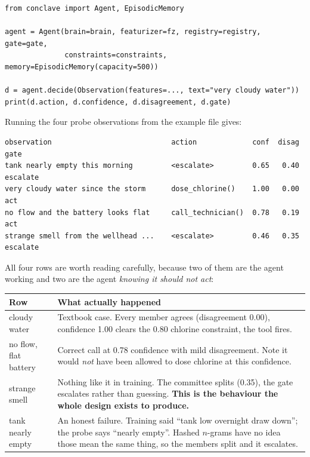 \begin{codebox}
\begin{lstlisting}[style=py]
from conclave import Agent, EpisodicMemory

agent = Agent(brain=brain, featurizer=fz, registry=registry, gate=gate,
              constraints=constraints, memory=EpisodicMemory(capacity=500))

d = agent.decide(Observation(features=..., text="very cloudy water"))
print(d.action, d.confidence, d.disagreement, d.gate)
\end{lstlisting}
\end{codebox}

\noindent Running the four probe observations from the example file gives:

\begin{codebox}
\begin{lstlisting}[style=out]
observation                            action             conf  disag      gate
tank nearly empty this morning         <escalate>         0.65   0.40  escalate
very cloudy water since the storm      dose_chlorine()    1.00   0.00       act
no flow and the battery looks flat     call_technician()  0.78   0.19       act
strange smell from the wellhead ...    <escalate>         0.46   0.35  escalate
\end{lstlisting}
\end{codebox}

All four rows are worth reading carefully, because two of them are the agent
working and two are the agent \emph{knowing it should not act}:

\begin{center}
\renewcommand{\arraystretch}{1.3}
\begin{tabular}{@{}>{\raggedright\arraybackslash}p{4.0cm}
                 >{\raggedright\arraybackslash}p{11.2cm}@{}}
\toprule
\rowcolor{conclavebg}
{\sffamily\bfseries\color{conclaveblue}Row} &
{\sffamily\bfseries\color{conclaveblue}What actually happened} \\
\midrule
cloudy water & Textbook case. Every member agrees (disagreement 0.00), confidence
1.00 clears the 0.80 chlorine constraint, the tool fires. \\
no flow, flat battery & Correct call at 0.78 confidence with mild disagreement.
Note it would \emph{not} have been allowed to dose chlorine at this confidence. \\
strange smell & Nothing like it in training. The committee splits (0.35), the gate
escalates rather than guessing. \textbf{This is the behaviour the whole design
exists to produce.} \\
tank nearly empty & An honest failure. Training said ``tank low overnight draw
down''; the probe says ``nearly empty''. Hashed $n$-grams have no idea those mean
the same thing, so the members split and it escalates. \\
\bottomrule
\end{tabular}
\end{center}

